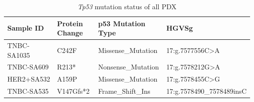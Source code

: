 
 \begin{table}[htbp]
   \centering
   \caption{\textit{Tp53} mutation status of all PDX}
     \begin{tabular}{|l|l|l|l|}
     \hline
     Sample ID & Protein Change & p53 Mutation Type & HGVSg \\
     \hline
    TNBC-SA1035  & C242F & Missense\_Mutation & 17:g.7577556C>A \\
     TNBC-SA609 & R213* & Nonsense\_Mutation & 17:g.7578212G>A \\
     HER2+SA532 & A159P & Missense\_Mutation & 17:g.7578455C>G \\
     TNBC-SA535 & V147Gfs*2 & Frame\_Shift\_Ins & 17:g.7578490\_7578489insC \\
     \hline
     \end{tabular}%
   \label{tab:Tp53mutationofPDX}%
 \end{table}%


